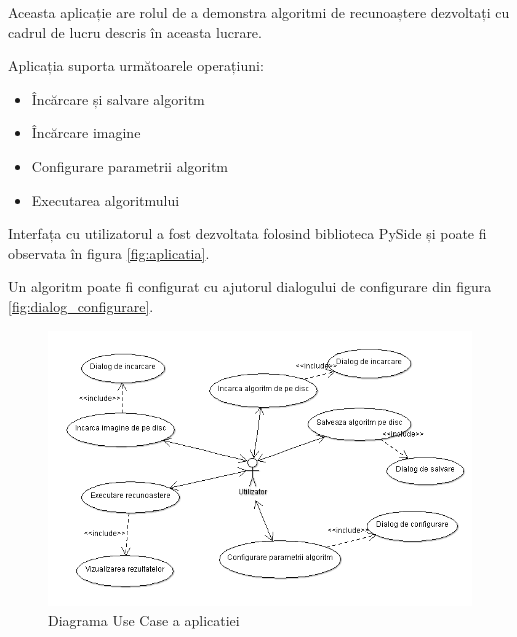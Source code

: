 
Aceasta aplicație are rolul de a demonstra algoritmi de recunoaștere dezvoltați cu cadrul de lucru descris în aceasta lucrare.

Aplicația suporta următoarele operațiuni:
\begin{itemize}
	\item Încărcare și salvare algoritm
	\item Încărcare imagine
	\item Configurare parametrii algoritm
	\item Executarea algoritmului
\end{itemize}

Interfața cu utilizatorul a fost dezvoltata folosind biblioteca PySide și poate fi observata în figura \ref{fig:aplicatia}.

Un algoritm poate fi configurat cu ajutorul dialogului de configurare din figura \ref{fig:dialog_configurare}.

\begin{figure}[h]
	\centering
		\includegraphics[width=1.00\textwidth]{uml/aplicatie_use_case.png}
	\caption{Diagrama Use Case a aplicatiei}
	\label{fig:aplicatie_use_case}
\end{figure}

